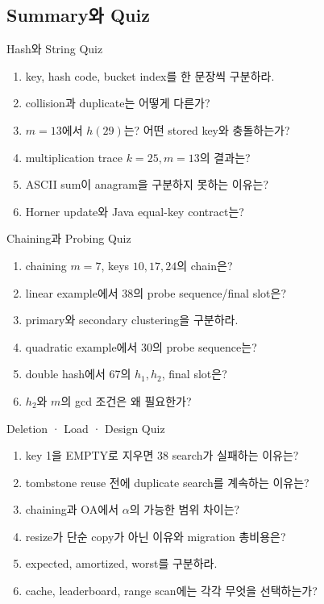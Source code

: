 \subsection{Summary와 Quiz}
\begin{frame}{Hash와 String Quiz}
\small\begin{enumerate}
\item key, hash code, bucket index를 한 문장씩 구분하라.
\item collision과 duplicate는 어떻게 다른가?
\item $m=13$에서 $h(29)$는? 어떤 stored key와 충돌하는가?
\item multiplication trace $k=25,m=13$의 결과는?
\item ASCII sum이 anagram을 구분하지 못하는 이유는?
\item Horner update와 Java equal-key contract는?
\end{enumerate}
\end{frame}
\begin{frame}{Chaining과 Probing Quiz}
\small\begin{enumerate}
\item chaining $m=7$, keys $10,17,24$의 chain은?
\item linear example에서 38의 probe sequence/final slot은?
\item primary와 secondary clustering을 구분하라.
\item quadratic example에서 30의 probe sequence는?
\item double hash에서 67의 $h_1,h_2$, final slot은?
\item $h_2$와 $m$의 gcd 조건은 왜 필요한가?
\end{enumerate}
\end{frame}
\begin{frame}{Deletion · Load · Design Quiz}
\small\begin{enumerate}
\item key 1을 EMPTY로 지우면 38 search가 실패하는 이유는?
\item tombstone reuse 전에 duplicate search를 계속하는 이유는?
\item chaining과 OA에서 $\alpha$의 가능한 범위 차이는?
\item resize가 단순 copy가 아닌 이유와 migration 총비용은?
\item expected, amortized, worst를 구분하라.
\item cache, leaderboard, range scan에는 각각 무엇을 선택하는가?
\end{enumerate}
\end{frame}
